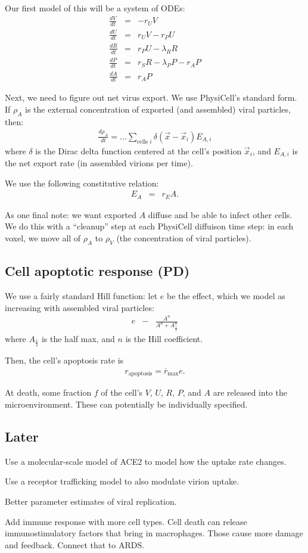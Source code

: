 \documentclass[12point]{article}
\begin{document}
Our first model of this will be a system of ODEs: 
\begin{eqnarray}
\frac{dV}{dt} & = & -r_U V \\
\frac{dU}{dt} & = & r_U V - r_P U \\
\frac{dR}{dt} & = & r_P U - \lambda_R R \\
\frac{dP}{dt} & = & r_S R - \lambda_P P - r_A P \\
\frac{dA}{dt} & = & r_A P
\end{eqnarray}

Next, we need to figure out net virus export. We use PhysiCell's standard form. If $\rho_A$ is the external concentration of exported (and assembled) viral particles, then: 
\begin{eqnarray}
\frac{d\rho_A}{dt} = ... \sum_{\textrm{cells } i} \delta( \vec{x}-\vec{x}_i ) E_{A,i}
\end{eqnarray}
where $\delta$ is the Dirac delta function centered at the cell's position
$\vec{x}_i$, and $E_{A,i}$ is the net export rate (in assembled virions per time). 

We use the following constitutive relation: 
\begin{eqnarray}
E_A & = & r_E A. 
\end{eqnarray}

As one final note: we want exported $A$ diffuse and be able to infect other cells. We do this with a ``cleanup'' step at each PhysiCell diffuison time step: in each voxel, we move all of $\rho_A$ to $\rho_V$ (the concentration 
of viral particles). 

\subsection{Cell apoptotic response (PD)}
We use a fairly standard Hill function: let $e$ be the effect, which we model as increasing with assembled viral particles: 
\begin{eqnarray}
e & - & \frac{ A^n  }{ A^n + A_{\frac{1}{2}}^n  }
\end{eqnarray}
where $A_{\frac{1}{2}}$ is the half max, and $n$ is the Hill coefficient. 

Then, the cell's apoptosis rate is 
\begin{eqnarray}
r_{\textrm{apoptosis}} = \overline{r}_\textrm{max} e. 
\end{eqnarray}

At death, some fraction $f$ of the cell's $V$, $U$, $R$, $P$, and $A$ are released into the microenvironment. These can potentially be individually specified. 

\subsection{Later}
Use a molecular-scale model of ACE2 to model how the uptake rate changes. 

Use a receptor trafficking model to also modulate virion uptake. 

Better parameter estimates of viral replication.

Add immune response with more cell types. Cell death can release immunostimulatory factors that bring in macrophages. Those cause more damage and feedback. Connect that to ARDS. 
\end{document}
